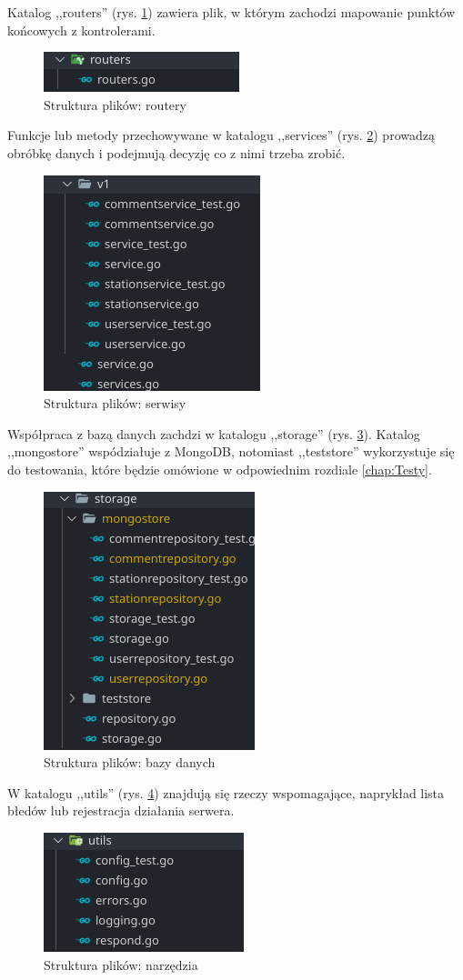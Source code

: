 Katalog ,,routers'' (rys. \ref{fig:routers}) zawiera plik, w którym zachodzi mapowanie punktów końcowych z kontrolerami.
\begin{figure}[ht]
\centering
\includegraphics[width=0.25\linewidth]{rys03/routers.png}
\caption{Struktura plików: routery}
\label{fig:routers}
\end{figure}

Funkcje lub metody przechowywane w katalogu ,,services'' (rys. \ref{fig:services}) prowadzą obróbkę danych i podejmują decyzję co z nimi trzeba zrobić.
\begin{figure}[ht]
    \centering
        \includegraphics[width=0.25\linewidth]{rys03/services.png}
        \caption{Struktura plików: serwisy}
    \label{fig:services}
\end{figure}

Współpraca z bazą danych zachdzi w katalogu ,,storage'' (rys. \ref{fig:storage}). Katalog ,,mongostore'' wspódziałuje z MongoDB, notomiast ,,teststore'' wykorzystuje się do testowania, które będzie omówione w odpowiednim rozdiale \ref{chap:Testy}.
\begin{figure}[ht]
    \centering
        \includegraphics[width=0.25\linewidth]{rys03/storage.png}
        \caption{Struktura plików: bazy danych}
    \label{fig:storage}
\end{figure}

W katalogu ,,utils'' (rys. \ref{fig:utils}) znajdują się rzeczy wspomagające, naprykład lista błedów lub rejestracja działania serwera.
\begin{figure}[ht]
    \centering
        \includegraphics[width=0.25\linewidth]{rys03/utils.png}
        \caption{Struktura plików: narzędzia}
    \label{fig:utils}
\end{figure}

